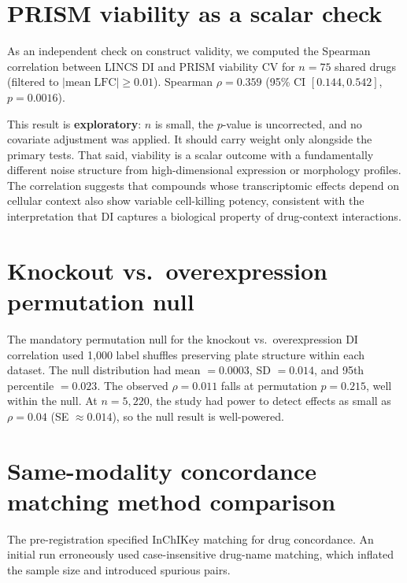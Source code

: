 \documentclass[11pt]{article}
\begin{document}
\section{PRISM viability as a scalar check}
\label{app:prism}

As an independent check on construct validity, we computed the Spearman
correlation between LINCS DI and PRISM viability CV for $n = 75$ shared
drugs (filtered to $|\mathrm{mean\;LFC}| \geq 0.01$).  Spearman
$\rho = 0.359$ (95\% CI $[0.144, 0.542]$, $p = 0.0016$).

This result is \textbf{exploratory}: $n$ is small, the $p$-value is
uncorrected, and no covariate adjustment was applied.  It should carry
weight only alongside the primary tests.  That said, viability is a
scalar outcome with a fundamentally different noise structure from
high-dimensional expression or morphology profiles.  The correlation
suggests that compounds whose transcriptomic effects depend on cellular
context also show variable cell-killing potency, consistent with the
interpretation that DI captures a biological property of drug-context
interactions.

\section{Knockout vs.\ overexpression permutation null}
\label{app:permutation}

The mandatory permutation null for the knockout vs.\
overexpression DI correlation used 1{,}000 label shuffles preserving
plate structure within each dataset.  The null distribution had mean
$= 0.0003$, SD $= 0.014$, and 95th percentile $= 0.023$.  The observed
$\rho = 0.011$ falls at permutation $p = 0.215$, well within the null.
At $n = 5{,}220$, the study had power to detect effects as small as
$\rho = 0.04$ (SE $\approx 0.014$), so the null result is well-powered.

\section{Same-modality concordance matching method comparison}
\label{app:a1matching}

The pre-registration specified InChIKey matching for drug concordance.
An initial run erroneously used case-insensitive drug-name matching,
which inflated the sample size and introduced spurious pairs.
\end{document}
